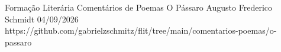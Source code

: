 \documentclass{article}
\begin{document}
\cover
    {Formação Literária}        %
    {Comentários de Poemas}     %
    {O Pássaro}                 %
    {Augusto Frederico Schmidt} %
    {04/09/2026}                %
    {https://github.com/gabrielzschmitz/flit/tree/main/comentarios-poemas/o-passaro}





\newpage
\printbibliography[title=Referências]
\end{document}
